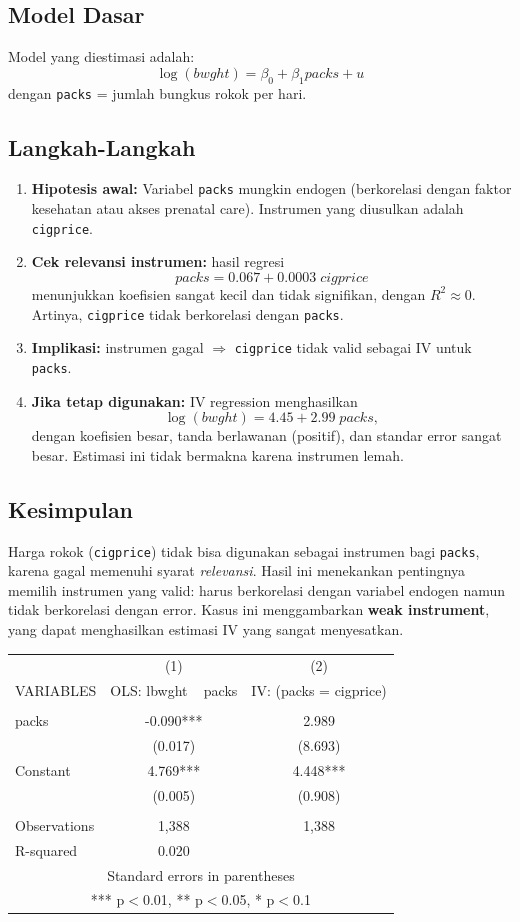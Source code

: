 \documentclass[]{article}
\begin{document}
\subsection*{Model Dasar}
Model yang diestimasi adalah:
\[
\log(bwght) = \beta_0 + \beta_1 packs + u
\]
dengan \texttt{packs} = jumlah bungkus rokok per hari.

\subsection*{Langkah-Langkah}
\begin{enumerate}
    \item \textbf{Hipotesis awal:} Variabel \texttt{packs} mungkin endogen (berkorelasi dengan faktor kesehatan atau akses prenatal care). Instrumen yang diusulkan adalah \texttt{cigprice}.
    \item \textbf{Cek relevansi instrumen:} hasil regresi
    \[
    packs = 0.067 + 0.0003 \; cigprice
    \]
    menunjukkan koefisien sangat kecil dan tidak signifikan, dengan $R^2 \approx 0$. Artinya, \texttt{cigprice} tidak berkorelasi dengan \texttt{packs}.
    \item \textbf{Implikasi:} instrumen gagal $\Rightarrow$ \texttt{cigprice} tidak valid sebagai IV untuk \texttt{packs}.
    \item \textbf{Jika tetap digunakan:} IV regression menghasilkan
    \[
    \log(bwght) = 4.45 + 2.99 \; packs,
    \]
    dengan koefisien besar, tanda berlawanan (positif), dan standar error sangat besar. Estimasi ini tidak bermakna karena instrumen lemah.
\end{enumerate}

\subsection*{Kesimpulan}
Harga rokok (\texttt{cigprice}) tidak bisa digunakan sebagai instrumen bagi \texttt{packs}, karena gagal memenuhi syarat \textit{relevansi}. 
Hasil ini menekankan pentingnya memilih instrumen yang valid: harus berkorelasi dengan variabel endogen namun tidak berkorelasi dengan error. 
Kasus ini menggambarkan \textbf{weak instrument}, yang dapat menghasilkan estimasi IV yang sangat menyesatkan.
\newline
\begin{tabular}{lcc} \hline
 & (1) & (2) \\
VARIABLES & OLS: lbwght ~ packs & IV: (packs = cigprice) \\ \hline
 &  &  \\
packs & -0.090*** & 2.989 \\
 & (0.017) & (8.693) \\
Constant & 4.769*** & 4.448*** \\
 & (0.005) & (0.908) \\
 &  &  \\
Observations & 1,388 & 1,388 \\
 R-squared & 0.020 &  \\ \hline
\multicolumn{3}{c}{ Standard errors in parentheses} \\
\multicolumn{3}{c}{ *** p$<$0.01, ** p$<$0.05, * p$<$0.1} \\
\end{tabular}
\end{document}
